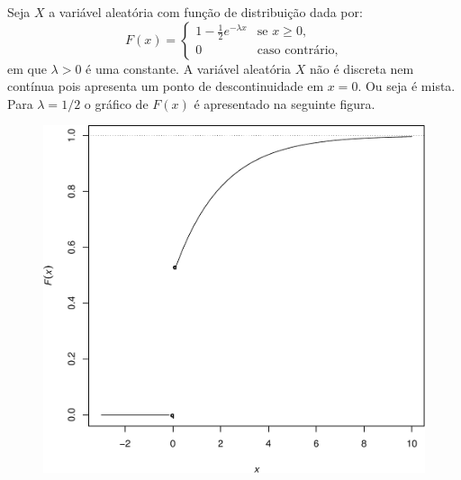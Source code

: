 \begin{frame}
\begin{exem}
	Seja $X$ a variável aleatória com função de distribuição dada por:%
	\begin{equation*}
	F(x)=
	\begin{cases}
	1-\frac{1}{2}e^{-\lambda x}&\text{se }x\geq 0, \\
	0&\text{caso contrário},%
	\end{cases}
	\end{equation*} 
	em que $\lambda >0$ é uma constante.  A variável aleatória $X$ não  é discreta nem contínua pois apresenta um ponto de descontinuidade em $x=0.$ Ou seja é mista. Para $\lambda=1/2$ o gráfico de $F(x)$ é apresentado na seguinte figura. %
\end{exem}

\begin{figure}[!htb]
	\begin{center}
		\includegraphics[scale=0.26]{fig17.pdf}
		
	\end{center}
\end{figure}

\end{frame}





